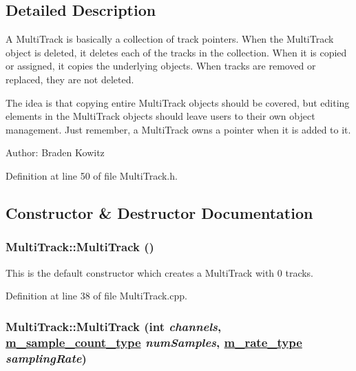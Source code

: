 \subsection{Detailed Description}
A Multi\-Track is basically a collection of track pointers. When the Multi\-Track object is deleted, it deletes each of the tracks in the collection. When it is copied or assigned, it copies the underlying objects. When tracks are removed or replaced, they are not deleted.

The idea is that copying entire Multi\-Track objects should be covered, but editing elements in the Multi\-Track objects should leave users to their own object management. Just remember, a Multi\-Track owns a pointer when it is added to it.

\begin{Desc}
\item[Author:]Braden Kowitz \end{Desc}




Definition at line 50 of file Multi\-Track.h.

\subsection{Constructor \& Destructor Documentation}
\hypertarget{classMultiTrack_a0}{
\subsubsection[MultiTrack]{\setlength{\rightskip}{0pt plus 5cm}Multi\-Track::Multi\-Track ()}}
\label{classMultiTrack_a0}


This is the default constructor which creates a Multi\-Track with 0 tracks. 

Definition at line 38 of file Multi\-Track.cpp.\hypertarget{classMultiTrack_a1}{
\subsubsection[MultiTrack]{\setlength{\rightskip}{0pt plus 5cm}Multi\-Track::Multi\-Track (int {\em channels}, \hyperlink{Types_8h_a1}{m\_\-sample\_\-count\_\-type} {\em num\-Samples}, \hyperlink{Types_8h_a4}{m\_\-rate\_\-type} {\em sampling\-Rate})}}
\label{classMultiTrack_a1}


